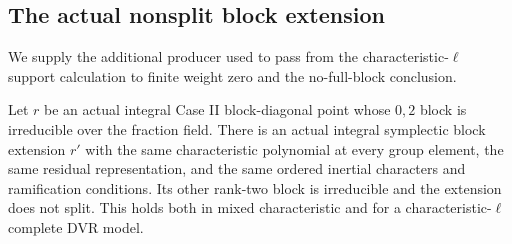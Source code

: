 \subsection{The actual nonsplit block extension}
\label{subsec:sr-four-actual-block-extension}

We supply the additional producer used to pass from the
characteristic-\(\ell\) support calculation to finite weight zero
and the no-full-block conclusion.

\begin{srproposition}\label{prop:sr-four-actual-block-extension}
Let \(r\) be an actual integral Case II block-diagonal point
whose \(0,2\) block is irreducible over the fraction field.
There is an actual integral symplectic block extension \(r'\)
with the same characteristic polynomial at every group
element, the same residual representation, and the same
ordered inertial characters and ramification conditions.
Its other rank-two block is irreducible and the extension
does not split.
This holds both in mixed characteristic and for a
characteristic-\(\ell\) complete DVR model.
\end{srproposition}
